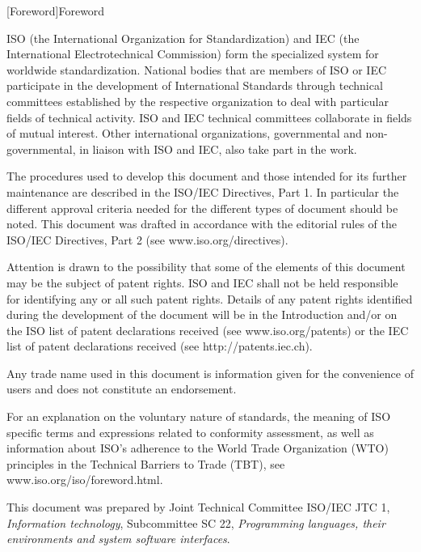 
[Foreword]{Foreword}

ISO (the International Organization for Standardization) and IEC (the International Electrotechnical Commission) form the specialized system for worldwide standardization. National bodies that are members of ISO or IEC participate in the development of International Standards through technical committees established by the respective organization to deal with particular fields of technical activity. ISO and IEC technical committees collaborate in fields of mutual interest. Other international organizations, governmental and non-governmental, in liaison with ISO and IEC, also take part in the work.

The procedures used to develop this document and those intended for its further maintenance are described in the ISO/IEC Directives, Part 1. In particular the different approval criteria needed for the different types of document should be noted. This document was drafted in accordance with the editorial rules of the ISO/IEC Directives, Part 2 (see www.iso.org/directives).

Attention is drawn to the possibility that some of the elements of this document may be the subject of patent rights. ISO and IEC shall not be held responsible for identifying any or all such patent rights. Details of any patent rights identified during the development of the document will be in the Introduction and/or on the ISO list of patent declarations received (see www.iso.org/patents) or the IEC list of patent declarations received (see http://patents.iec.ch).

Any trade name used in this document is information given for the convenience of users and does not constitute an endorsement.

For an explanation on the voluntary nature of standards, the meaning of ISO specific terms and expressions related to conformity assessment, as well as information about ISO’s adherence to the World Trade Organization (WTO) principles in the Technical Barriers to Trade (TBT), see www.iso.org/iso/foreword.html.

This document was prepared by Joint Technical Committee ISO/IEC JTC 1, \textit{Information technology}, Subcommittee SC 22, \textit{Programming languages, their environments and system software interfaces}.

